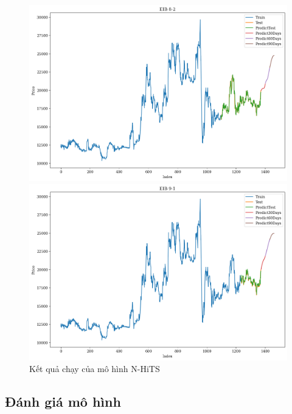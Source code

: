 \begin{figure}[H]
\begin{minipage}{0.15\textwidth}
    \includegraphics[width=1\textwidth]{resources/chapter-5/newdata1/result/EIB_N-HiTS_8-2.png}
    \end{minipage}
    \hfill
        \begin{minipage}{0.15\textwidth}
    \centering
    \includegraphics[width=1\textwidth]{resources/chapter-5/newdata1/result/EIB_N-HiTS_9-1.png}
    \end{minipage}
    \hfill
    
    \caption{Kết quả chạy của mô hình N-HiTS}
    \label{fig:n-hits_result}
\end{figure}

\subsection{Đánh giá mô hình} 
